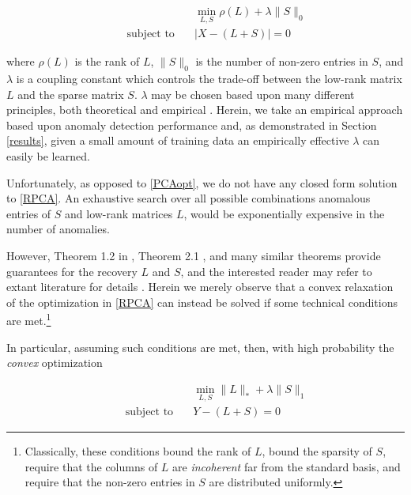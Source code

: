 \documentclass[conference]{IEEEtran}
\begin{document}
\begin{align} \label{RPCA}
  &\min_{L,S}\rho(L)+\lambda\|S\|_{0}\\ \nonumber
  \qquad \text{subject to} \quad &
                                   |X-(L+S)| = 0
\end{align}

\noindent where $\rho(L)$ is the rank of $L$, $\|S\|_{0}$ is the
number of non-zero entries in $S$, and $\lambda$ is a coupling
constant which controls the trade-off between the low-rank matrix $L$
and the sparse matrix $S$.  $\lambda$ may be chosen based upon many different principles, both theoretical and empirical \cite{Candes2011,Paffenroth2012a,Paffenroth2013b,paffenroth2018robust}.  Herein, we take an empirical approach based upon anomaly detection performance and, as demonstrated in Section \ref{results}, given a small amount of training data an empirically effective $\lambda$ can easily be learned.

Unfortunately, as opposed to
\eqref{PCAopt}, we do not have any closed form solution to
\eqref{RPCA}.   An exhaustive search over all possible
combinations anomalous entries of $S$ and low-rank matrices $L$, 
would be exponentially expensive in the number of anomalies.

However, Theorem 1.2 in \cite{Candes2011}, Theorem 2.1
\cite{Paffenroth2012a}, and many similar theorems provide guarantees for the recovery $L$ and $S$, and the interested reader may refer to extant
literature for details \cite{Candes2009, candes09ex, Chandrasekaran2009,
  Candes2011, Paffenroth2012a, Paffenroth2013b}.
Herein we merely observe that a convex relaxation of the optimization in \eqref{RPCA} can 
instead be solved if some technical conditions are met.\footnote{Classically, these 
conditions bound the
  rank of $L$, bound the sparsity of $S$, require that the columns of
  $L$ are \textit{incoherent} far from the standard basis, and require
  that the non-zero entries in $S$ are distributed uniformly.}

In particular, assuming such conditions are met, then, with high
probability the \emph{convex} optimization 

\begin{align} \label{mainalg}
  &\min_{L,S}\|L\|_{*}+\lambda\|S\|_{1}\\ \nonumber
  \qquad \text{subject to} \quad &
                                   Y-(L+S)=0
\end{align}
\end{document}
